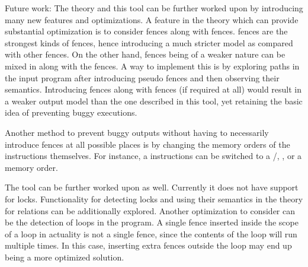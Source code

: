 Future work:
The theory and this tool can be further worked upon
by introducing many new features and optimizations. A feature in the
theory which can provide substantial optimization is to consider
\moar fences along with \mosc fences. \mosc fences are the strongest 
kinds of fences, hence introducing a much stricter model as compared with
other fences. On the other hand, \moar fences
being of a weaker nature can be mixed in along with the \mosc
fences. A way to implement this is by exploring \setSW 
paths in the input program after introducing
pseudo fences and then observing their semantics. Introducing \moar fences
along with \mosc fences (if required at all) would result in a
weaker output model than the one described in this tool, yet retaining
the basic idea of preventing buggy executions.

Another method to prevent buggy outputs without having to necessarily
introduce \mosc fences at all possible places is by changing the 
memory orders of the instructions themselves. For instance, a \morlx 
instructions can be switched to a \morel/\moacq, \moar, or a \mosc memory order.

The tool can be further worked upon as well. Currently it does not have support
for locks. Functionality for detecting locks and using their semantics
in the theory for \setSC relations can be additionally explored. Another optimization
to consider can be the detection of loops in the program. A single fence
inserted inside the scope of a loop in actuality is not a single fence, since
the contents of the loop will run multiple times. In this case, inserting extra fences
outside the loop may end up being a more optimized solution.